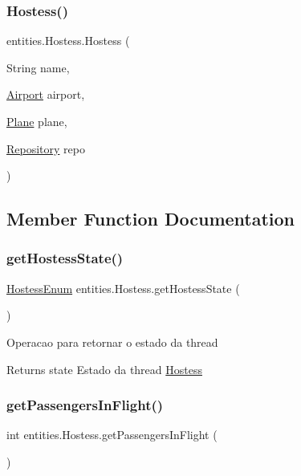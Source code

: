 \subsubsection{\texorpdfstring{Hostess()}{Hostess()}}
{\footnotesize\ttfamily entities.\+Hostess.\+Hostess (\begin{DoxyParamCaption}\item[{String}]{name,  }\item[{\hyperlink{classshared_regions_1_1_airport}{Airport}}]{airport,  }\item[{\hyperlink{classshared_regions_1_1_plane}{Plane}}]{plane,  }\item[{\hyperlink{classshared_regions_1_1_repository}{Repository}}]{repo }\end{DoxyParamCaption})}



\subsection{Member Function Documentation}
\mbox{\label{classentities_1_1_hostess_acee3f8042f80e5252e6ed73255117d4e}} 
\subsubsection{\texorpdfstring{get\+Hostess\+State()}{getHostessState()}}
{\footnotesize\ttfamily \hyperlink{enumentities_1_1_hostess_enum}{Hostess\+Enum} entities.\+Hostess.\+get\+Hostess\+State (\begin{DoxyParamCaption}{ }\end{DoxyParamCaption})}

Operacao para retornar o estado da thread \begin{DoxyReturn}{Returns}
state Estado da thread \hyperlink{classentities_1_1_hostess}{Hostess} 
\end{DoxyReturn}
\mbox{\label{classentities_1_1_hostess_af9d14239c4536df5a3975700d4c853fb}} 
\subsubsection{\texorpdfstring{get\+Passengers\+In\+Flight()}{getPassengersInFlight()}}
{\footnotesize\ttfamily int entities.\+Hostess.\+get\+Passengers\+In\+Flight (\begin{DoxyParamCaption}{ }\end{DoxyParamCaption})}

